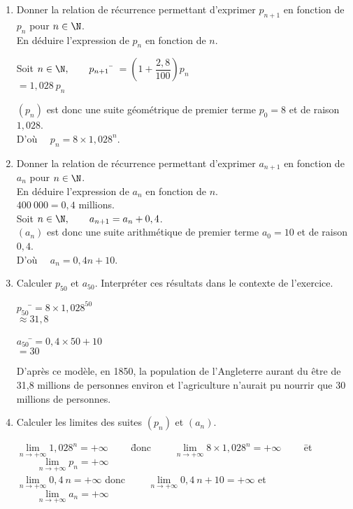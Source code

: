 \documentclass[a4paper,11pt,exos]{nsi} %
\begin{document}
\begin{enumerate}
    \item \textcolor{UGLiBlue}{Donner la relation de récurrence permettant d'exprimer $p_{n+1}$ en fonction de $p_n$ pour $n\in\N$.\\
    En déduire l'expression de $p_n$ en fonction de $n$.}
    \begin{tabbing}
        Soit $n\in\N, \qquad p_{n+1}$   \=  $=\left(1+\dfrac{2,8}{100}\right) p_n$\\
        \>  $=1,028\ p_n$
    \end{tabbing}
    $(p_n)$ est donc une suite géométrique de premier terme $p_0=8$ et de raison $1,028$.\\
    D'où $\quad p_n=8\times 1,028^n$.
    \item \textcolor{UGLiBlue}{Donner la relation de récurrence permettant d'exprimer $a_{n+1}$ en fonction de $a_n$ pour $n\in\N$.\\
    En déduire l'expression de $a_n$ en fonction de $n$.}\\[.5em]
    $400\ 000=0,4$ millions.\\
    Soit $n\in\N, \qquad a_{n+1}=a_n+0,4$.\\[.5em]
    $(a_n)$ est donc une suite arithmétique de premier terme $a_0=10$ et de raison $0,4$.\\
    D'où $\quad a_n=0,4 n+10$.
    \item \textcolor{UGLiBlue}{Calculer $p_{50}$ et $a_{50}$. 
    Interpréter ces résultats dans le contexte de l'exercice.}
    \begin{multicols}{2}
        \begin{tabbing}
            $p_{50}$    \=$=8\times 1,028^{50}$\\
                \>  $\approx 31,8$
        \end{tabbing}
        \begin{tabbing}
            $a_{50}$    \=$=0,4\times 50+10$\\
                \>  $=30$
        \end{tabbing}
    \end{multicols}
    D'après ce modèle, en 1850, la population de l'Angleterre aurant du être de 31,8 millions de personnes environ et l'agriculture n'aurait pu nourrir que 30 millions de personnes.

    \item \textcolor{UGLiBlue}{Calculer les limites des suites $(p_n)$ et $(a_n)$.}

        \begin{tabbing}
            $\lim\limits_{n\to+\infty} 1,028^n=+\infty \qquad$ \= donc $\qquad \lim\limits_{n\to+\infty} 8\times 1,028^n=+\infty\qquad$ \= et $\qquad \lim\limits_{n\to+\infty} p_n=+\infty$\\[.5em]
            $\lim\limits_{n\to+\infty} 0,4\ n=+\infty$  \> donc $\qquad \lim\limits_{n\to+\infty} 0,4\ n+10=+\infty$    \> et $\qquad \lim\limits_{n\to+\infty} a_n=+\infty$
        \end{tabbing}
  

\end{enumerate}
\end{document}
